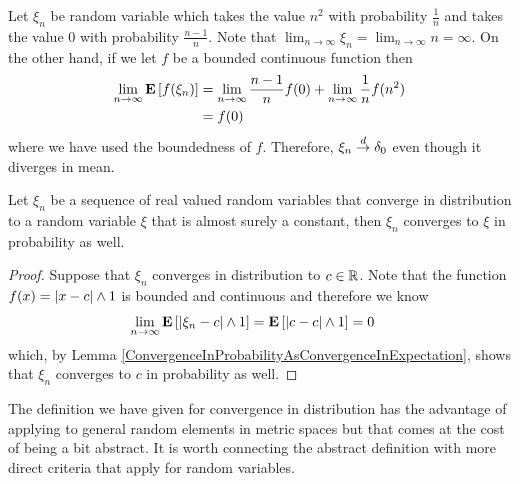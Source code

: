 \begin{examp}
Let $\xi_n$ be random variable which takes the value $n^2$ with
probability $\frac{1}{n}$ and takes the value $0$ with probability
$\frac{n-1}{n}$.  Note that $\lim_{n \to \infty} \xi_n = \lim_{n \to
  \infty} n = \infty$.  On the other hand, if we let $f$ be a bounded
continuous function then 
\begin{align*}
\lim_{n \to \infty} \textbf{E}\left[f(\xi_n)\right] &= \lim_{n \to
  \infty}\frac{n-1}{n} f(0) + \lim_{n \to \infty}\frac{1}{n} f(n^2) \\
&= f(0)
\end{align*}
where we have used the boundedness of $f$.
Therefore, $\xi_n \overset{d}\to \delta_0$ even though it diverges in mean.
\end{examp}

\begin{lem}\label{ConvergeInDistributionToConstant}Let $\xi_n$ be a sequence of real valued random variables
  that converge in distribution to a random variable $\xi$ that is
  almost surely a constant, then $\xi_n$ converges to $\xi$ in probability
  as well.
\end{lem}
\begin{proof}
Suppose that $\xi_n$ converges in distribution to $c \in \mathbb{R}$.
Note that the function $f(x) = \left \vert x-c \right \vert \wedge 1$ is bounded and
continuous and therefore we know 
\begin{align*}
\lim_{n \to \infty} \textbf{E}\left[\left \vert \xi_n - c \right \vert \wedge 1\right] &=
  \textbf{E}\left[\left \vert c - c \right \vert \wedge 1\right] = 0
\end{align*}
which, by Lemma
\ref{ConvergenceInProbabilityAsConvergenceInExpectation}, shows that $\xi_n$ converges to $c$ in probability as well.
\end{proof}

The definition we have given for convergence in distribution has the
advantage of applying to general random elements in metric spaces but
that comes at the cost of being a bit abstract.  It is worth
connecting the abstract definition with more direct criteria that
apply for random variables.  

